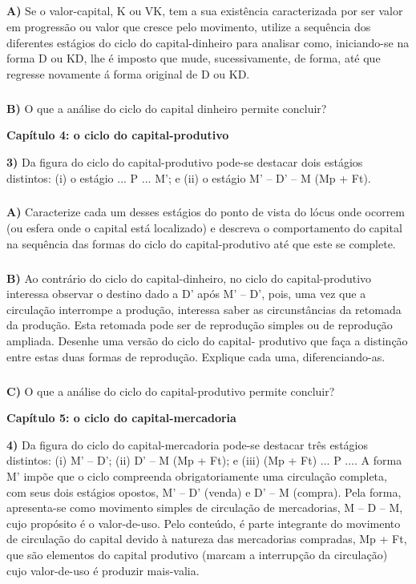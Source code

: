 \documentclass[a4paper, 12pt]{article} %
\begin{document}
\subparagraph{} \textbf{A)} Se o valor-capital, K ou VK, tem a sua existência caracterizada por ser valor em progressão ou
valor que cresce pelo movimento, utilize a sequência dos diferentes estágios do ciclo do
capital-dinheiro para analisar como, iniciando-se na forma D ou KD, lhe é imposto que mude, sucessivamente, de forma, até que regresse novamente á forma original de D ou KD.

\subparagraph{} \textbf{B)} O que a análise do ciclo do capital dinheiro permite concluir?
\vspace{0.5cm}
\par \textbf{Capítulo 4: o ciclo do capital-produtivo}
\vspace{0.5cm}


\textbf{3)} Da figura do ciclo do capital-produtivo pode-se destacar dois estágios distintos: (i) o estágio ... P ...
M’; e (ii) o estágio M’ – D’ – M (Mp + Ft).

\subparagraph{} \textbf{A)} Caracterize cada um desses estágios do ponto de vista do lócus onde ocorrem (ou esfera onde
o capital está localizado) e descreva o comportamento do capital na sequência das formas do
ciclo do capital-produtivo até que este se complete.

\subparagraph{} \textbf{B)} Ao contrário do ciclo do capital-dinheiro, no ciclo do capital-produtivo interessa observar o
destino dado a D’ após M’ – D’, pois, uma vez que a circulação interrompe a produção,
interessa saber as circunstâncias da retomada da produção. Esta retomada pode ser de
reprodução simples ou de reprodução ampliada. Desenhe uma versão do ciclo do capital-
produtivo que faça a distinção entre estas duas formas de reprodução. Explique cada uma,
diferenciando-as.

\subparagraph{} \textbf{C)} O que a análise do ciclo do capital-produtivo permite concluir?

\vspace{0.5cm}

\par \textbf{Capítulo 5: o ciclo do capital-mercadoria}
\vspace{0.5cm}

\par \textbf{4)} Da figura do ciclo do capital-mercadoria pode-se destacar três estágios distintos: (i) M’ – D’; (ii) D’ – M
(Mp + Ft); e (iii) (Mp + Ft) ... P .... A forma M’ impõe que o ciclo compreenda obrigatoriamente uma
circulação completa, com seus dois estágios opostos, M’ – D’ (venda) e D’ – M (compra). Pela forma,
apresenta-se como movimento simples de circulação de mercadorias, M – D – M, cujo propósito é o
valor-de-uso. Pelo conteúdo, é parte integrante do movimento de circulação do capital devido à
natureza das mercadorias compradas, Mp + Ft, que são elementos do capital produtivo (marcam a
interrupção da circulação) cujo valor-de-uso é produzir mais-valia.
\end{document}
